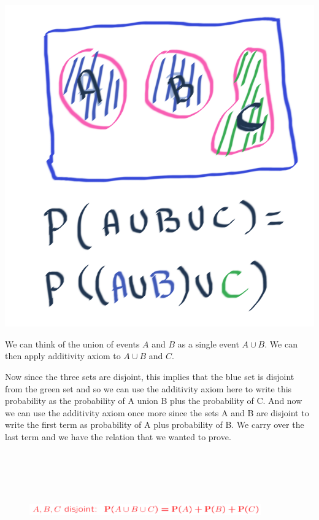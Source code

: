 \documentclass{tufte-handout}
\begin{document}
\begin{marginfigure}
  \includegraphics{UnionThree1}
  \caption{We can think of the union of events $A$ and $B$ as a single event $A \cup B$. We can then apply additivity  axiom to $A \cup B$ and $C$.}
\end{marginfigure}


Now since the three sets are disjoint, this implies that the blue set is disjoint from the green set and so
we can use the additivity axiom here to write this probability as the probability of A union B plus the
probability of C. And now we can use the additivity axiom once more since the sets A and B are disjoint
to write the first term as probability of A plus probability of B. We carry over the last term and we have
the relation that we wanted to prove.

\begin{figure}
  \includegraphics[width=10cm, height=5cm]{ThreeEventFormula}
\end{figure}
\end{document}
